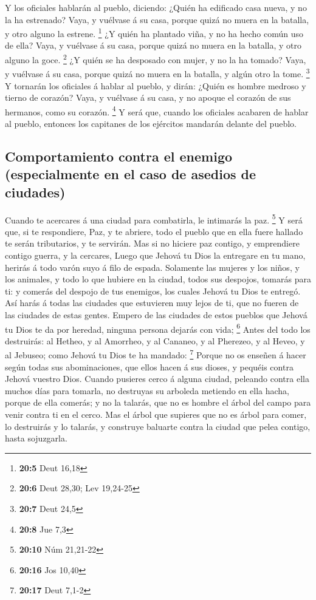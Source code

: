  Y los oficiales hablarán al pueblo, diciendo: ¿Quién ha
edificado casa nueva, y no la ha estrenado? Vaya, y vuélvase á su casa,
porque quizá no muera en la batalla, y otro alguno la estrene.
\footnote{\textbf{20:5} Deut 16,18}  ¿Y quién ha plantado
viña, y no ha hecho común uso de ella? Vaya, y vuélvase á su casa,
porque quizá no muera en la batalla, y otro alguno la goce. \footnote{\textbf{20:6}
  Deut 28,30; Lev 19,24-25}  ¿Y quién se ha desposado con
mujer, y no la ha tomado? Vaya, y vuélvase á su casa, porque quizá no
muera en la batalla, y algún otro la tome. \footnote{\textbf{20:7} Deut
  24,5}  Y tornarán los oficiales á hablar al pueblo, y
dirán: ¿Quién es hombre medroso y tierno de corazón? Vaya, y vuélvase á
su casa, y no apoque el corazón de sus hermanos, como su corazón.
\footnote{\textbf{20:8} Jue 7,3}  Y será que, cuando los
oficiales acabaren de hablar al pueblo, entonces los capitanes de los
ejércitos mandarán delante del pueblo.

\hypertarget{comportamiento-contra-el-enemigo-especialmente-en-el-caso-de-asedios-de-ciudades}{%
\subsection{Comportamiento contra el enemigo (especialmente en el caso
de asedios de
ciudades)}\label{comportamiento-contra-el-enemigo-especialmente-en-el-caso-de-asedios-de-ciudades}}

 Cuando te acercares á una ciudad para combatirla, le
intimarás la paz. \footnote{\textbf{20:10} Núm 21,21-22} 
Y será que, si te respondiere, Paz, y te abriere, todo el pueblo que en
ella fuere hallado te serán tributarios, y te servirán. 
Mas si no hiciere paz contigo, y emprendiere contigo guerra, y la
cercares,  Luego que Jehová tu Dios la entregare en tu
mano, herirás á todo varón suyo á filo de espada. 
Solamente las mujeres y los niños, y los animales, y todo lo que hubiere
en la ciudad, todos sus despojos, tomarás para ti: y comerás del despojo
de tus enemigos, los cuales Jehová tu Dios te entregó. 
Así harás á todas las ciudades que estuvieren muy lejos de ti, que no
fueren de las ciudades de estas gentes.  Empero de las
ciudades de estos pueblos que Jehová tu Dios te da por heredad, ninguna
persona dejarás con vida; \footnote{\textbf{20:16} Jos 10,40}
 Antes del todo los destruirás: al Hetheo, y al Amorrheo,
y al Cananeo, y al Pherezeo, y al Heveo, y al Jebuseo; como Jehová tu
Dios te ha mandado: \footnote{\textbf{20:17} Deut 7,1-2} 
Porque no os enseñen á hacer según todas sus abominaciones, que ellos
hacen á sus dioses, y pequéis contra Jehová vuestro Dios.
 Cuando pusieres cerco á alguna ciudad, peleando contra
ella muchos días para tomarla, no destruyas su arboleda metiendo en ella
hacha, porque de ella comerás; y no la talarás, que no es hombre el
árbol del campo para venir contra ti en el cerco.  Mas el
árbol que supieres que no es árbol para comer, lo destruirás y lo
talarás, y construye baluarte contra la ciudad que pelea contigo, hasta
sojuzgarla.

